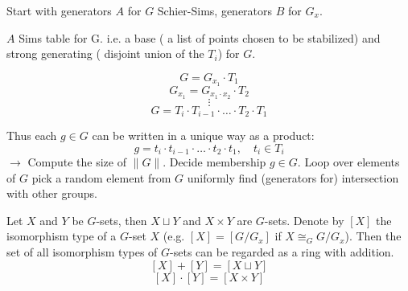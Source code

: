 \documentclass[12pt]{amsart}
\theoremstyle{definition}
\begin{document}
Start with generators $A$ for $G$ Schier-Sims, generators $B$ for $G_{x}$.

$A$ Sims table for G. i.e. a base ( a list of points chosen to be stabilized) and strong generating ( disjoint union of the $T_{i}$) for $G$.

$$G = G_{x_{1}} \cdot T_{1}$$
$$G_{x_{1}} = G_{x_{1} \cdot x_{2}} \cdot T_{2}$$
$$ \vdots$$
$$G = T_{i} \cdot T_{i - 1} \cdot \ldots \cdot T_{2} \cdot T_{1}$$

Thus each $g \in G$ can be written in a unique way as a product:
$$g = t_{i} \cdot t_{i - 1} \cdot \ldots \cdot t_{2} \cdot t_{1}, \quad t_{i} \in T_{i}$$
 $\rightarrow$ Compute the size of $\| G \|$. Decide membership $g \in G$. Loop over elements of $G$ pick a random element from $G$ uniformly find (generators for) intersection with other groups.

Let $X$ and $Y$ be $G$-sets, then $X \sqcup Y$ and $X \times Y$ are $G$-sets. Denote by $[X]$ the isomorphism type of a $G$-set $X$ (e.g. $[X] = [G/G_{x}]$ if $X \cong_{G} G/G_{x}$). Then the set of all isomorphism types of $G$-sets can be regarded as a ring with addition. $$[X] + [Y] = [X \sqcup Y]$$ $$[X] \cdot [Y] = [ X \times Y]$$
\nocite{*}




\end{document}
